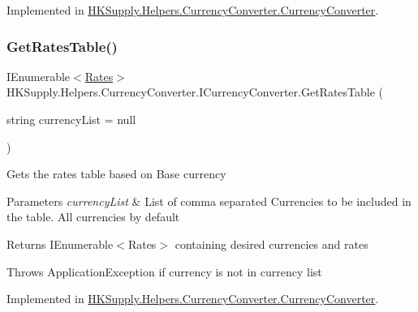 Implemented in \mbox{\hyperlink{class_h_k_supply_1_1_helpers_1_1_currency_converter_1_1_currency_converter_a5aee715203b5d6854d21aae80d4aa577}{H\+K\+Supply.\+Helpers.\+Currency\+Converter.\+Currency\+Converter}}.

\mbox{\label{interface_h_k_supply_1_1_helpers_1_1_currency_converter_1_1_i_currency_converter_a3b1e96fafb375bda812c9d7a6e9fc983}} 
\subsubsection{\texorpdfstring{Get\+Rates\+Table()}{GetRatesTable()}}
{\footnotesize\ttfamily I\+Enumerable$<$\mbox{\hyperlink{struct_h_k_supply_1_1_helpers_1_1_currency_converter_1_1_rates}{Rates}}$>$ H\+K\+Supply.\+Helpers.\+Currency\+Converter.\+I\+Currency\+Converter.\+Get\+Rates\+Table (\begin{DoxyParamCaption}\item[{string}]{currency\+List = {\ttfamily null} }\end{DoxyParamCaption})}



Gets the rates table based on Base currency 


\begin{DoxyParams}{Parameters}
{\em currency\+List} & List of comma separated Currencies to be included in the table. All currencies by default\\
\hline
\end{DoxyParams}
\begin{DoxyReturn}{Returns}
I\+Enumerable$<$\+Rates$>$ containing desired currencies and rates
\end{DoxyReturn}


Throws Application\+Exception if currency is not in currency list

Implemented in \mbox{\hyperlink{class_h_k_supply_1_1_helpers_1_1_currency_converter_1_1_currency_converter_a9b5ebe58cdabdaec1f1053574a7d792a}{H\+K\+Supply.\+Helpers.\+Currency\+Converter.\+Currency\+Converter}}.

